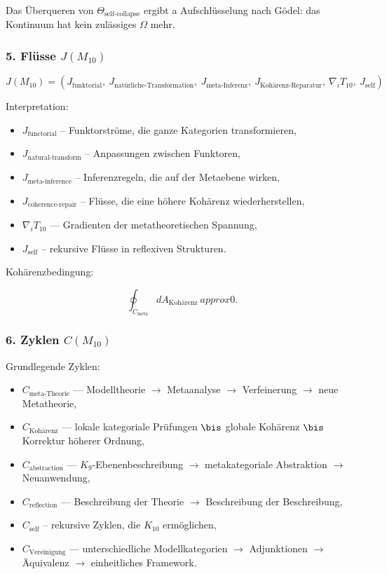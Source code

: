 Das Überqueren von $\Theta_{\mathrm{self\mbox{-}collapse}}$ ergibt a
Aufschlüsselung nach Gödel:
das Kontinuum hat kein zulässiges $\Omega$ mehr.

\subsubsection*{5. Flüsse $J(M_{10})$}

\[
J(M_{10}) =
(J_{\mathrm{funktorial}},\
 J_{\mathrm{natürliche \mbox{-}Transformation}},\
 J_{\mathrm{meta\mbox{-}Inferenz}},\
 J_{\mathrm{Kohärenz\mbox{-}Reparatur}},\
 \nabla_i T_{10},\
 J_{\mathrm{self}})
\]

Interpretation:

\begin{itemize}
    \item $J_{\mathrm{functorial}}$ – Funktorströme, die ganze Kategorien transformieren,
    \item $J_{\mathrm{natural\mbox{-}transform}}$ – Anpassungen zwischen Funktoren,
    \item $J_{\mathrm{meta\mbox{-}inference}}$ – Inferenzregeln, die auf der Metaebene wirken,
    \item $J_{\mathrm{coherence\mbox{-}repair}}$ – Flüsse, die eine höhere Kohärenz wiederherstellen,
    \item $\nabla_i T_{10}$ — Gradienten der metatheoretischen Spannung,
    \item $J_{\mathrm{self}}$ – rekursive Flüsse in reflexiven Strukturen.
\end{itemize}

Kohärenzbedingung:

\[
\oint_{C_{\mathrm{meta}}} dA_{\mathrm{Kohärenz}} \ approx 0.
\]

\subsubsection*{6. Zyklen $C(M_{10})$}

Grundlegende Zyklen:

\begin{itemize}
    \item $C_{\mathrm{meta\mbox{-}Theorie}}$
        — Modelltheorie $\to$ Metaanalyse $\to$ Verfeinerung $\to$ neue Metatheorie,
    \item $C_{\mathrm{Kohärenz}}$
        — lokale kategoriale Prüfungen $\bis$ globale Kohärenz $\bis$ Korrektur höherer Ordnung,
    \item $C_{\mathrm{abstraction}}$
        — $K_9$-Ebenenbeschreibung $\to$ metakategoriale Abstraktion $\to$ Neuanwendung,
    \item $C_{\mathrm{reflection}}$
        — Beschreibung der Theorie $\to$ Beschreibung der Beschreibung,
    \item $C_{\mathrm{self}}$
        – rekursive Zyklen, die $K_{10}$ ermöglichen,
    \item $C_{\mathrm{Vereinigung}}$
        — unterschiedliche Modellkategorien $\to$ Adjunktionen $\to$ Äquivalenz $\to$ einheitliches Framework.
\end{itemize}

